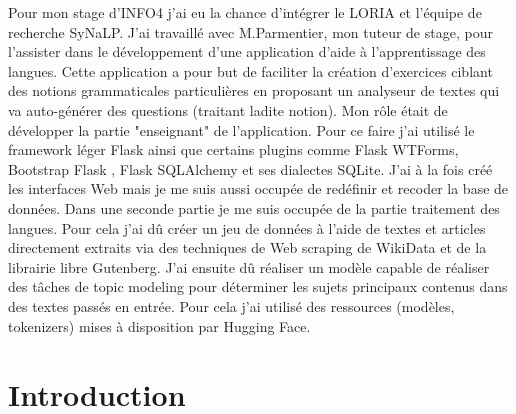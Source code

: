 \documentclass[12pt]{article}
\begin{document}
Pour mon stage d’INFO4 j’ai eu la chance d’intégrer le LORIA et l’équipe de recherche SyNaLP. J’ai travaillé avec M.Parmentier, mon tuteur de stage, pour l’assister dans le développement d’une application d’aide à l’apprentissage des langues. Cette application a pour but de faciliter la création d’exercices ciblant des notions grammaticales particulières en proposant un analyseur de textes qui va auto-générer des questions (traitant ladite notion). 
Mon rôle était de développer la partie "enseignant" de l’application. Pour ce faire j’ai utilisé le framework léger Flask ainsi que certains plugins comme Flask WTForms, Bootstrap Flask , Flask SQLAlchemy et ses dialectes SQLite. J’ai à la fois créé les interfaces Web mais je me suis aussi occupée de redéfinir et recoder la base de données. 
Dans une seconde partie je me suis occupée de la partie traitement des langues. Pour cela j'ai dû créer un jeu de données à l'aide de textes et articles directement extraits via des techniques de Web scraping de WikiData et de la librairie libre Gutenberg. J'ai ensuite dû réaliser un modèle capable de réaliser des tâches de topic modeling pour déterminer les sujets principaux contenus dans des textes passés en entrée. Pour cela j'ai utilisé des ressources (modèles, tokenizers) mises à disposition par Hugging Face. 

\newpage

\tableofcontents

\listoffigures

\newpage

\section{Introduction}
\end{document}
